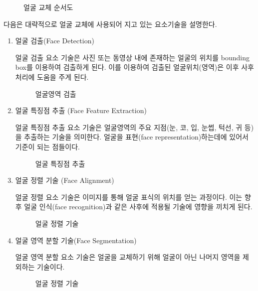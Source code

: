 \documentclass{oblivoir}
\begin{document}
\begin{figure}[h!]
\centering
\caption{얼굴 교체 순서도}
\end{figure}

다음은 대략적으로 얼굴 교체에 사용되어 지고 있는 요소기술을 설명한다.

                        
\begin{enumerate}%
    \item  얼굴 검출(Face Detection)

    얼굴 검출 요소 기술은 사진 또는 동영상 내에 존재하는 얼굴의 위치를 bounding box를 이용하여 검출하게 된다. 이를 이용하여 검출된 얼굴위치(영역)은 이후 사후처리에 도움을 주게 된다.

    \begin{figure}[h!]
        \centering
        \caption{얼굴영역 검출\cite{reference1}}
    \end{figure}
            
    \item 얼굴 특징점 추출 (Face Feature Extraction)

    얼굴 특징점 추출 요소 기술은 얼굴영역의 주요 지점(눈, 코, 입, 눈썹, 턱선, 귀 등)을 추출하는 기술을 의미한다. 얼굴을 표현(face representation)하는데에 있어서 기준이 되는 점들이다.
    \begin{figure}[h!]
        \centering
        \caption{얼굴 특징점 추출\cite{reference2}}
    \end{figure}

    \item 얼굴 정렬 기술 (Face Alignment)

    얼굴 정렬 요소 기술은 이미지를 통해 얼굴 표식의 위치를 얻는 과정이다. 이는 향후 얼굴 인식(face recognition)과 같은 사후에 적용될 기술에 영향을 끼치게 된다.
    \begin{figure}[h!]
        \centering
        \caption{얼굴 정렬 기술\cite{reference3}}
    \end{figure}

    \item 얼굴 영역 분할 기술(Face Segmentation)

    얼굴 영역 분할 요소 기술은 얼굴을 교체하기 위해 얼굴이 아닌 나머지 영역을 제외하는 기술이다.

    \begin{figure}[h!]
        \centering
        \caption{ 얼굴 정렬 기술\cite{reference3}}
    \end{figure}


\end{enumerate}
\end{document}
